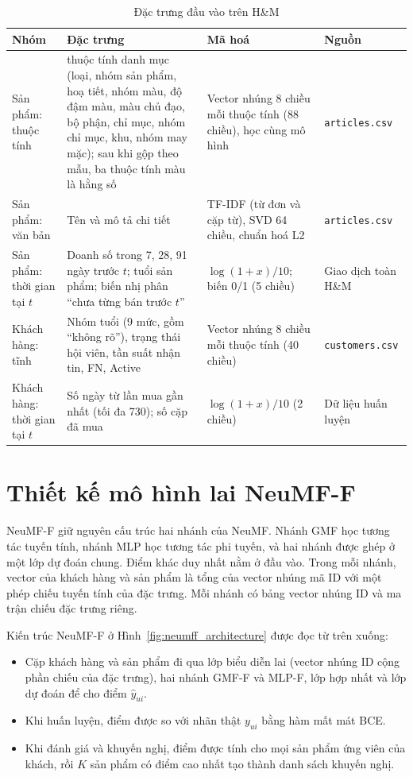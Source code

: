 \begin{table}[H]
    \centering\small
    \caption{Đặc trưng đầu vào trên H\&M}
    \label{tab:features}
    \begin{tabularx}{\textwidth}{|>{\raggedright\arraybackslash}p{2.4cm}|>{\raggedright\arraybackslash}X|>{\raggedright\arraybackslash}p{3.2cm}|>{\raggedright\arraybackslash}p{2.8cm}|}
        \hline
        Nhóm & Đặc trưng & Mã hoá & Nguồn \\
        \hline
        Sản phẩm: thuộc tính & 11 thuộc tính danh mục (loại, nhóm sản phẩm, hoạ tiết, nhóm màu, độ đậm màu, màu chủ đạo, bộ phận, chỉ mục, nhóm chỉ mục, khu, nhóm may mặc); sau khi gộp theo mẫu, ba thuộc tính màu là hằng số & Vector nhúng 8 chiều mỗi thuộc tính (88 chiều), học cùng mô hình & \texttt{articles.csv} \\ \hline
        Sản phẩm: văn bản & Tên và mô tả chi tiết & TF-IDF (từ đơn và cặp từ), SVD 64 chiều, chuẩn hoá L2 & \texttt{articles.csv} \\ \hline
        Sản phẩm: thời gian tại $t$ & Doanh số trong 7, 28, 91 ngày trước $t$; tuổi sản phẩm; biến nhị phân ``chưa từng bán trước $t$'' & $\log(1+x)/10$; biến 0/1 (5 chiều) & Giao dịch toàn H\&M \\ \hline
        Khách hàng: tĩnh & Nhóm tuổi (9 mức, gồm ``không rõ''), trạng thái hội viên, tần suất nhận tin, FN, Active & Vector nhúng 8 chiều mỗi thuộc tính (40 chiều) & \texttt{customers.csv} \\ \hline
        Khách hàng: thời gian tại $t$ & Số ngày từ lần mua gần nhất (tối đa 730); số cặp đã mua & $\log(1+x)/10$ (2 chiều) & Dữ liệu huấn luyện \\
        \hline
    \end{tabularx}
\end{table}

\section{Thiết kế mô hình lai NeuMF-F}
\label{sec:model_design}

NeuMF-F giữ nguyên cấu trúc hai nhánh của NeuMF. Nhánh GMF học tương tác tuyến tính, nhánh MLP học tương tác phi tuyến, và hai nhánh được ghép ở một lớp dự đoán chung. Điểm khác duy nhất nằm ở đầu vào. Trong mỗi nhánh, vector của khách hàng và sản phẩm là tổng của vector nhúng mã ID với một phép chiếu tuyến tính của đặc trưng. Mỗi nhánh có bảng vector nhúng ID và ma trận chiếu đặc trưng riêng.

Kiến trúc NeuMF-F ở Hình~\ref{fig:neumff_architecture} được đọc từ trên xuống:
\begin{itemize}
    \item Cặp khách hàng và sản phẩm đi qua lớp biểu diễn lai (vector nhúng ID cộng phần chiếu của đặc trưng), hai nhánh GMF-F và MLP-F, lớp hợp nhất và lớp dự đoán để cho điểm $\hat{y}_{ui}$.
    \item Khi huấn luyện, điểm được so với nhãn thật $y_{ui}$ bằng hàm mất mát BCE.
    \item Khi đánh giá và khuyến nghị, điểm được tính cho mọi sản phẩm ứng viên của khách, rồi $K$ sản phẩm có điểm cao nhất tạo thành danh sách khuyến nghị.
\end{itemize}

